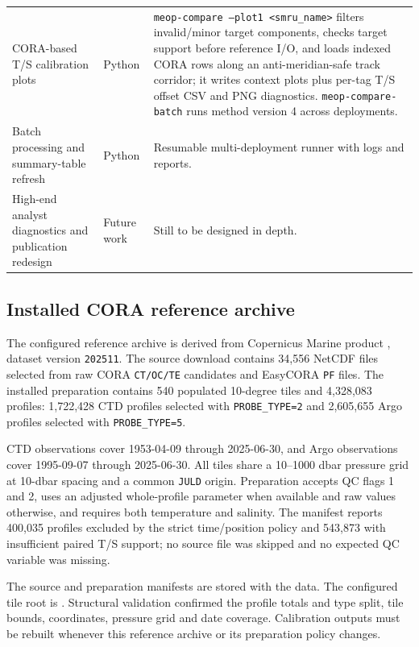 \documentclass[11pt,a4paper]{article}
\newcommand{\pkg}[1]{\texttt{#1}}
\begin{document}
\begin{longtable}{>{\raggedright\arraybackslash}p{} >{\raggedright\arraybackslash}p{} >{\raggedright\arraybackslash}p{}}
CORA-based T/S calibration plots & Python & \pkg{meop-compare --plot1 <smru\_name>} filters invalid/minor target components, checks target support before reference I/O, and loads indexed CORA rows along an anti-meridian-safe track corridor; it writes context plots plus per-tag T/S offset CSV and PNG diagnostics. \pkg{meop-compare-batch} runs method version 4 across deployments. \\
Batch processing and summary-table refresh & Python & Resumable multi-deployment runner with logs and reports. \\
High-end analyst diagnostics and publication redesign & Future work & Still to be designed in depth. \\
\bottomrule
\end{longtable}

\subsection{Installed CORA reference archive}

The configured reference archive is derived from Copernicus Marine product
, dataset version \pkg{202511}. The source
download contains 34,556 NetCDF files selected from raw CORA \pkg{CT/OC/TE} candidates
and EasyCORA \pkg{PF} files. The installed preparation contains 540 populated 10-degree
tiles and 4,328,083 profiles: 1,722,428 CTD profiles selected with
\pkg{PROBE\_TYPE=2} and 2,605,655 Argo profiles selected with \pkg{PROBE\_TYPE=5}.

CTD observations cover 1953-04-09 through 2025-06-30, and Argo observations cover
1995-09-07 through 2025-06-30. All tiles share a 10--1000 dbar pressure grid at 10-dbar
spacing and a common \pkg{JULD} origin. Preparation accepts QC flags 1 and 2, uses an
adjusted whole-profile parameter when available and raw values otherwise, and requires
both temperature and salinity. The manifest reports 400,035 profiles excluded by the
strict time/position policy and 543,873 with insufficient paired T/S support; no source
file was skipped and no expected QC variable was missing.

The source and preparation manifests are stored with the data. The configured tile root
is . Structural validation
confirmed the profile totals and type split, tile bounds, coordinates, pressure grid and
date coverage. Calibration outputs must be rebuilt whenever this reference archive or
its preparation policy changes.
\end{document}
